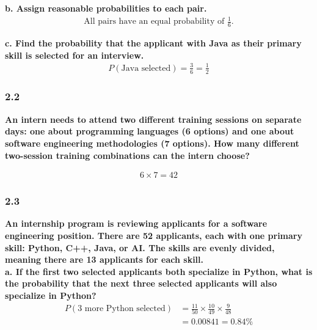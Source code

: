 \documentclass[
	a4paper, %
	10pt, %
	unnumberedsections, %
	twoside, %
]{LTJournalArticle}
\begin{document}
\textbf{b. Assign reasonable probabilities to each pair.}
\begin{equation*}
    \begin{aligned}
        \text{All pairs have an equal probability of } \frac{1}{6} \text{.}
    \end{aligned}
\end{equation*}

\textbf{c. Find the probability that the applicant with Java as their primary skill is selected for an interview.} \\
\begin{equation*}
    \begin{aligned}
        P(\text{Java selected}) = \frac{3}{6} = \frac{1}{2}
    \end{aligned}
\end{equation*}

\subsubsection{2.2}
\textbf{An intern needs to attend two different training sessions on separate days: one about programming languages (6 options) and one about software engineering methodologies (7 options). How many different two-session training combinations can the intern choose?}

\begin{equation*}
    \begin{aligned}
        6 \times 7 = 42
    \end{aligned}
\end{equation*}
\vspace*{1pt}\noindent
\subsubsection{2.3}
\textbf{An internship program is reviewing applicants for a software engineering position. There are 52 applicants, each with one primary skill: Python, C++, Java, or AI. The skills are evenly divided, meaning there are 13 applicants for each skill.} \\

\textbf{a. If the first two selected applicants both specialize in Python, what is the probability that the next three selected applicants will also specialize in Python?} \\
\begin{equation*}
    \begin{aligned}
        P(\text{3 more Python selected}) &= \frac{11}{50} \times \frac{10}{49} \times \frac{9}{48} \\
        &= 0.00841 = 0.84\%
    \end{aligned}
\end{equation*}
\vspace{2pt}
\end{document}
